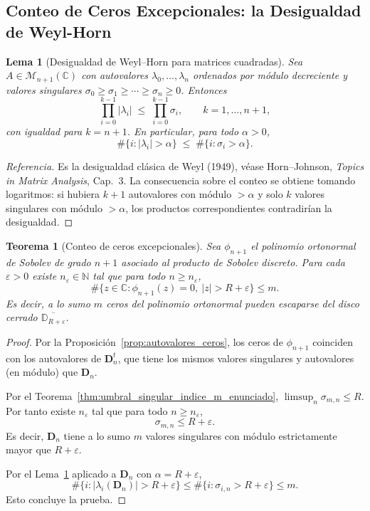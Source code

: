 \documentclass[12pt,a4paper]{article}
\newtheorem{theorem}{Teorema}
\newtheorem{lemma}{Lema}
\theoremstyle{definition}
\theoremstyle{remark}
\newcommand{\C}{\mathbb{C}}
\begin{document}

\subsection{Conteo de Ceros Excepcionales: la Desigualdad de Weyl-Horn}

\begin{lemma}[Desigualdad de Weyl--Horn para matrices cuadradas]\label{lem:weyl_horn}
  Sea $A\in\mathcal M_{n+1}(\C)$ con autovalores $\lambda_0,\dots,\lambda_n$
  ordenados por módulo decreciente y valores singulares
  $\sigma_0\ge\sigma_1\ge\cdots\ge\sigma_n\ge 0$. Entonces
  \[
    \prod_{i=0}^{k-1}|\lambda_i|\;\le\;\prod_{i=0}^{k-1}\sigma_i,
    \qquad k=1,\dots,n+1,
  \]
  con igualdad para $k=n+1$. En particular, para todo $\alpha>0$,
  \[
    \#\{i:|\lambda_i|>\alpha\}\;\le\;\#\{i:\sigma_i>\alpha\}.
  \]
\end{lemma}

\begin{proof}[Referencia]
  Es la desigualdad clásica de Weyl (1949), véase
  Horn--Johnson, \emph{Topics in Matrix Analysis}, Cap.~3.
  La consecuencia sobre el conteo se obtiene tomando logaritmos:
  si hubiera $k+1$ autovalores con módulo $>\alpha$ y solo $k$ valores
  singulares con módulo $>\alpha$, los productos correspondientes
  contradirían la desigualdad.
\end{proof}

\begin{theorem}[Conteo de ceros excepcionales]\label{thm:conteo_ceros}
  Sea $\phi_{n+1}$ el polinomio ortonormal de Sobolev de grado $n+1$
  asociado al producto de Sobolev discreto. Para cada $\varepsilon>0$ existe $n_\varepsilon\in\mathbb N$
  tal que para todo $n\ge n_\varepsilon$,
  \[
    \#\{z\in\C:\phi_{n+1}(z)=0,\ |z|>R+\varepsilon\}\le m.
  \]
  Es decir, a lo sumo $m$ ceros del polinomio ortonormal pueden escaparse del
  disco cerrado $\overline{\mathbb D_{R+\varepsilon}}$.
\end{theorem}

\begin{proof}
  Por la Proposición~\ref{prop:autovalores_ceros}, los ceros de
  $\phi_{n+1}$ coinciden con los autovalores de $\mathbf D_n^t$, que tiene
  los mismos valores singulares y autovalores (en módulo) que $\mathbf D_n$.

  Por el Teorema~\ref{thm:umbral_singular_indice_m_enunciado}, $\limsup_n\sigma_{m,n}\le R$.
  Por tanto existe $n_\varepsilon$ tal que para todo $n\ge n_\varepsilon$,
  \[
    \sigma_{m,n}\le R+\varepsilon.
  \]
  Es decir, $\mathbf D_n$ tiene a lo sumo $m$ valores singulares con módulo
  estrictamente mayor que $R+\varepsilon$.

  Por el Lema~\ref{lem:weyl_horn} aplicado a $\mathbf D_n$ con $\alpha=R+\varepsilon$,
  \[
    \#\{i:|\lambda_i(\mathbf D_n)|>R+\varepsilon\}
    \le
    \#\{i:\sigma_{i,n}>R+\varepsilon\}\le m.
  \]
  Esto concluye la prueba.
\end{proof}
\end{document}
